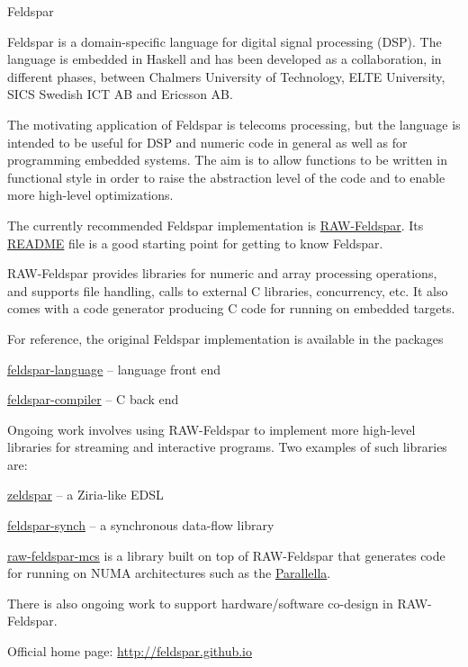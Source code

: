 \begin{hcarentry}{Feldspar}
\label{feldspar}
\makeheader

Feldspar is a domain-specific language for digital signal processing (DSP).
The language is embedded in Haskell and has been developed as a collaboration,
in different phases, between Chalmers University of
Technology, ELTE University, SICS Swedish ICT AB and Ericsson AB.

The motivating application of Feldspar is telecoms processing, but the
language is intended to be useful for DSP and numeric code in general as well
as for programming embedded systems. The aim is to allow functions to be
written in functional style in order to raise the abstraction level of the
code and to enable more high-level optimizations.

The currently recommended Feldspar implementation is
\mbox{\href{http://hackage.haskell.org/package/raw-feldspar}{RAW-Feldspar}}.
Its
\mbox{\href{https://github.com/Feldspar/raw-feldspar/blob/master/README.md}{README}}
file is a good starting point for getting to know Feldspar.

RAW-Feldspar provides libraries for numeric and array processing operations,
and supports file handling, calls to external C libraries, concurrency, etc.
It also comes with a code generator producing C code for running on embedded
targets.

For reference, the original Feldspar implementation is available in the
packages

\begin{compactitem}
\item
  \href{http://hackage.haskell.org/package/feldspar-language}{feldspar-language}
  -- language front end
\item
  \href{http://hackage.haskell.org/package/feldspar-compiler}{feldspar-compiler}
  -- C back end
\end{compactitem}

Ongoing work involves using RAW-Feldspar to implement more high-level
libraries for streaming and interactive programs. Two examples of such
libraries are:

\begin{compactitem}
\item \href{https://github.com/koengit/zeldspar}{zeldspar} -- a Ziria-like
  EDSL
\item \href{https://github.com/emilaxelsson/feldspar-synch}{feldspar-synch} --
  a synchronous data-flow library
\end{compactitem}

\href{https://github.com/kmate/raw-feldspar-mcs}{raw-feldspar-mcs} is a
library built on top of RAW-Feldspar that generates code for running on NUMA
architectures such as the \href{http://www.parallella.org}{Parallella}.

There is also ongoing work to support hardware/software co-design in
RAW-Feldspar.

\FurtherReading
\begin{compactitem}
\item Official home page: \url{http://feldspar.github.io}
\end{compactitem}
\end{hcarentry}
